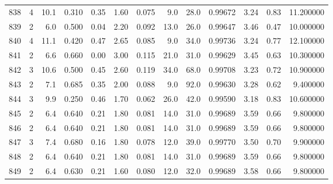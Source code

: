 \begin{tabular}{lrrrrrrrrrrrr}
838  &        4 &           10.1 &             0.310 &         0.35 &            1.60 &      0.075 &                  9.0 &                  28.0 &  0.99672 &  3.24 &       0.83 &  11.200000 \\
839  &        2 &            6.0 &             0.500 &         0.04 &            2.20 &      0.092 &                 13.0 &                  26.0 &  0.99647 &  3.46 &       0.47 &  10.000000 \\
840  &        4 &           11.1 &             0.420 &         0.47 &            2.65 &      0.085 &                  9.0 &                  34.0 &  0.99736 &  3.24 &       0.77 &  12.100000 \\
841  &        2 &            6.6 &             0.660 &         0.00 &            3.00 &      0.115 &                 21.0 &                  31.0 &  0.99629 &  3.45 &       0.63 &  10.300000 \\
842  &        3 &           10.6 &             0.500 &         0.45 &            2.60 &      0.119 &                 34.0 &                  68.0 &  0.99708 &  3.23 &       0.72 &  10.900000 \\
843  &        2 &            7.1 &             0.685 &         0.35 &            2.00 &      0.088 &                  9.0 &                  92.0 &  0.99630 &  3.28 &       0.62 &   9.400000 \\
844  &        3 &            9.9 &             0.250 &         0.46 &            1.70 &      0.062 &                 26.0 &                  42.0 &  0.99590 &  3.18 &       0.83 &  10.600000 \\
845  &        2 &            6.4 &             0.640 &         0.21 &            1.80 &      0.081 &                 14.0 &                  31.0 &  0.99689 &  3.59 &       0.66 &   9.800000 \\
846  &        2 &            6.4 &             0.640 &         0.21 &            1.80 &      0.081 &                 14.0 &                  31.0 &  0.99689 &  3.59 &       0.66 &   9.800000 \\
847  &        3 &            7.4 &             0.680 &         0.16 &            1.80 &      0.078 &                 12.0 &                  39.0 &  0.99770 &  3.50 &       0.70 &   9.900000 \\
848  &        2 &            6.4 &             0.640 &         0.21 &            1.80 &      0.081 &                 14.0 &                  31.0 &  0.99689 &  3.59 &       0.66 &   9.800000 \\
849  &        2 &            6.4 &             0.630 &         0.21 &            1.60 &      0.080 &                 12.0 &                  32.0 &  0.99689 &  3.58 &       0.66 &   9.800000 \\

\end{tabular}
